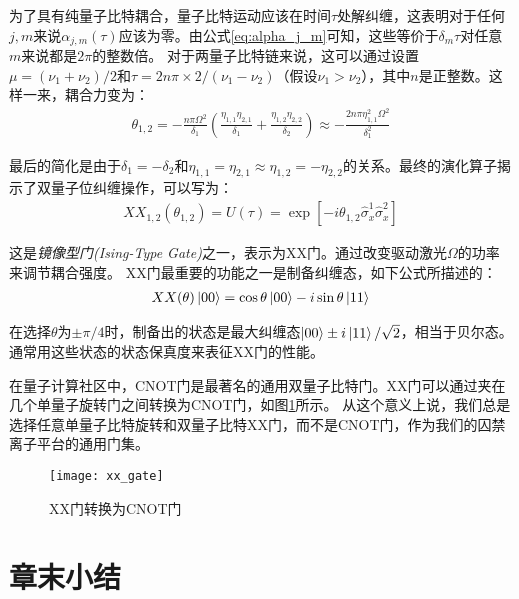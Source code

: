 为了具有纯量子比特耦合，量子比特运动应该在时间$\tau$处解纠缠，这表明对于任何$j,m$来说$\alpha_{j,m}(\tau)$应该为零。由公式\eqref{eq:alpha_j_m}可知，这些等价于$\delta_m\tau$对任意$m$来说都是$2\pi$的整数倍。
对于两量子比特链来说，这可以通过设置$\mu=(\nu_1+\nu_2)/2$和$\tau=2n\pi\times2/(\nu_1-\nu_2)$（假设$\nu_1>\nu_2$），其中$n$是正整数。这样一来，耦合力变为：
\begin{align}
    \theta_{1,2}=-\frac{n\pi\Omega^2}{\delta_1}\left(\frac{\eta_{1,1}\eta_{2,1}}{\delta_1}+\frac{\eta_{1,2}\eta_{2,2}}{\delta_2}\right)\approx-\frac{2n\pi\eta_{1,1}^2\Omega^2}{\delta_1^2}
\end{align}

最后的简化是由于$\delta_1=-\delta_2$和$\eta_{1,1}=\eta_{2,1}\approx\eta_{1,2}=-\eta_{2,2}$的关系。最终的演化算子揭示了双量子位纠缠操作，可以写为：
\begin{align}
    XX_{1,2}(\theta_{1,2})=U(\tau)=\exp[-i\theta_{1,2}\hat{\sigma}_x^1\hat{\sigma}_x^2]
\end{align}

这是\emph{镜像型门(Ising-Type Gate)}之一，表示为XX门。通过改变驱动激光$\Omega$的功率来调节耦合强度。
XX门最重要的功能之一是制备纠缠态，如下公式所描述的：
\begin{align}
    XX(\theta)\ket{00}=\cos\theta\ket{00}-i\sin\theta\ket{11}
\end{align}

在选择$\theta$为$\pm\pi/4$时，制备出的状态是最大纠缠态$\ket{00}\pm i\ket{11}/\sqrt{2}$，相当于贝尔态。通常用这些状态的状态保真度来表征XX门的性能。

在量子计算社区中，CNOT门是最著名的通用双量子比特门。XX门可以通过夹在几个单量子旋转门之间转换为CNOT门\cite[]{Debnath_Linke_Figgatt_Landsman_Wright_Monroe_2016}，如图\ref{fig:xx_gate}所示。
从这个意义上说，我们总是选择任意单量子比特旋转和双量子比特XX门，而不是CNOT门，作为我们的囚禁离子平台的通用门集。


\begin{figure}
    \centering
    \caption[XX门转换为CNOT门]{XX门转换为CNOT门\label{fig:xx_gate}}
    \texttt{[image: xx\_gate]}
\end{figure}

\section[章末小结]{章末小结}











